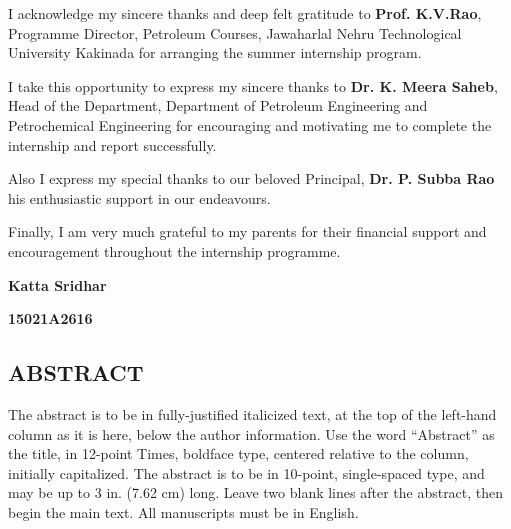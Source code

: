 \documentclass[11pt,a4paper]{report}
\begin{document}
\vspace{1em}


I acknowledge my sincere thanks and deep felt gratitude to \textbf{Prof. K.V.Rao}, Programme Director, Petroleum Courses, Jawaharlal Nehru Technological University Kakinada for arranging the summer internship program.

\vspace{1em}

I take this opportunity to express my sincere thanks to \textbf{Dr. K. Meera Saheb}, Head of the Department, Department of Petroleum Engineering and Petrochemical Engineering for encouraging and motivating me to complete the internship and report successfully.

\vspace{1em}

Also I express my special thanks to our beloved Principal, \textbf{Dr. P. Subba Rao} his enthusiastic support in our endeavours.

\vspace{1em}

Finally, I am very much grateful to my parents for their financial support and encouragement throughout the internship programme.

\vspace{1em}

\hfill \textbf{Katta Sridhar}

\hfill \textbf{15021A2616} \hspace{0.005\textwidth}
        
\newpage        
\tableofcontents



\newpage

\begin{center}
\section*{ABSTRACT}
\end{center}
  
The abstract is to be in fully-justified italicized text, at the top of the left-hand column as it is here, below the author information. Use the word “Abstract” as the title, in 12-point Times, boldface type, centered relative to the column, initially capitalized. The abstract is to be in 10-point, single-spaced type, and may be up to 3 in. (7.62 cm) long. Leave two blank lines after the abstract, then begin the main text. All manuscripts must be in English.
  
\end{document}
